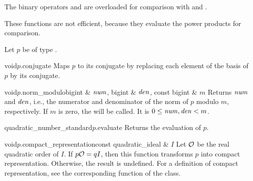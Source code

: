 
\COMP

The binary operators \code{==} and \code{!=} are overloaded for comparison with
 and .

These functions are not efficient, because they evaluate the power products for comparison.



\BASIC

Let $p$ be of type .

\begin{fcode}{void}{$p$.conjugate}{}
  Maps $p$ to its conjugate by replacing each element of the basis of $p$ by its conjugate.
\end{fcode}

\begin{cfcode}{void}{$p$.norm_modulo}{bigint & $\mathit{num}$, bigint & $\mathit{den}$, const bigint & $m$}
  Returns $\mathit{num}$ and $\mathit{den}$, i.e., the numerator and denominator of the norm of $p$ modulo $m$,
  respectively.  If $m$ is zero, the \LEH will be called.  It is $0 \leq \mathit{num}, \mathit{den} < m$.
\end{cfcode}

\begin{cfcode}{quadratic_number_standard}{$p$.evaluate}{}
  Returns the evaluation of $p$.
\end{cfcode}



\HIGH

\begin{fcode}{void}{$p$.compact_representation}{const quadratic_ideal & $I$}
  Let $\mathcal{O}$ be the real quadratic order of $I$.  If $p \mathcal{O} = q I$, then this function transforms
  $p$ into compact representation.  Otherwise, the result is undefined.  For a definition of
  compact representation, see the corresponding  function of the class.
\end{fcode}

